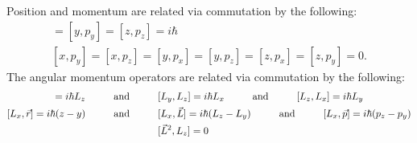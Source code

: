 Position and momentum are related via commutation by the following:
\begin{align}
	[x,p_x]=[y,p_y]=[z,p_z]=i\hbar \\
	[x,p_y]=[x,p_z]=[y,p_x]=[y,p_z]=[z,p_x]=[z,p_y]=0.
\end{align} 
The angular momentum operators are related via commutation by the following:
\begin{align}
	[L_x,L_y]=i\hbar L_z \andspace{1cm} &[L_y,L_z]=i\hbar L_x \andspace{1cm} [L_z,L_x]=i\hbar L_y \\
	[L_x,\vec{r}]=i\hbar (z-y) \andspace{1cm} &[L_x,\vec{L}] = i\hbar (L_z-L_y) \andspace{1cm} [L_x,\vec{p}] = i\hbar(p_z-p_y) \\
	&[\vec{L}^2,L_z] = 0 
\end{align}